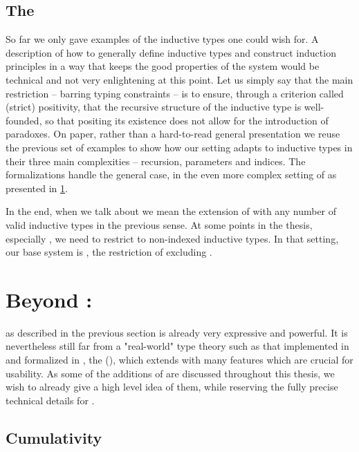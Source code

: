 \subsection{The }

So far we only gave examples of the inductive types one could wish for.
A description of how to generally define inductive types and construct induction principles
in a way that keeps the good properties of the system would be technical and not
very enlightening at this point. Let us simply say that the main restriction – barring typing
constraints – is to ensure, through a criterion called (strict) positivity,
that the recursive structure of the inductive type
is well-founded, so that positing its existence does not allow for the
introduction of paradoxes.
On paper, rather than a hard-to-read general presentation we reuse the previous
set of examples to show how our setting adapts to inductive types in their
three main complexities – recursion, parameters and indices.
The formalizations handle the general case, in the even more complex setting of 
as presented in \cref{sec:tech-pcuic}.

In the end, when we talk about  we mean the extension of  with any number of
valid inductive types in the previous sense.
At some points in the thesis, especially , we need to restrict to
non-indexed inductive types. In that setting, our base system is ,
the restriction of  excluding .



\section{Beyond : }
\label{sec:tech-pcuic}

 as described in the previous section is already very expressive and powerful.
It is nevertheless
still far from a "real-world" type theory such as that implemented in  and
formalized in , the  (), which extends  with many features which are crucial
for usability. 
As some of the additions of  are discussed throughout this
thesis, we wish to already give a high level idea of them,
while reserving the fully precise technical details for .

\subsection{Cumulativity}

